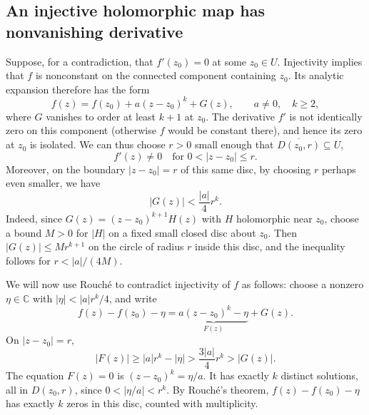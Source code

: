 \documentclass[11pt]{article}
\theoremstyle{plain}
\theoremstyle{definition}
\theoremstyle{boldremark}
\theoremstyle{remark}
\numberwithin{equation}{section}
\newcommand{\C}{\mathbb{C}}
\begin{document}
\subsection{An injective holomorphic map has nonvanishing derivative}

Suppose, for a contradiction, that $f'(z_0)=0$ at some $z_0\in U$.
Injectivity implies that $f$ is nonconstant on the connected component
containing $z_0$. Its analytic expansion therefore has the form
\[
 f(z)=f(z_0)+a(z-z_0)^k+G(z),\qquad a\ne0,\quad k\geq2,
\]
where $G$ vanishes to order at least $k+1$ at $z_0$.
The derivative $f'$ is not identically zero on this component (otherwise
$f$ would be constant there), and hence its zero at $z_0$ is isolated. We can thus
choose $r>0$ small enough that $\overline{D(z_0,r)}\subseteq U$,
\[
 f'(z)\ne0\quad\text{for }0<|z-z_0|\leq r.
\]
Moreover, on the boundary $|z-z_0|=r$ of this same disc, by choosing $r$
perhaps even smaller, we have
\[
 |G(z)| < \frac{|a|}{4}r^k.
\]
Indeed, since $G(z)=(z-z_0)^{k+1}H(z)$ with $H$
holomorphic near $z_0$, choose a bound $M>0$ for $|H|$ on a fixed small
closed disc about $z_0$. Then $|G(z)|\leq Mr^{k+1}$ on the circle of
radius $r$ inside this disc, and the inequality follows for $r<|a|/(4M)$.

We will now use Rouch\'e to contradict injectivity of $f$ as follows: choose a nonzero $\eta\in\C$ with $|\eta|<|a|r^k/4$, and write
\[
 f(z)-f(z_0)-\eta
 =\underbrace{a(z-z_0)^k-\eta}_{F(z)}+G(z).
\]
On $|z-z_0|=r$,
\[
 |F(z)|\geq|a|r^k-|\eta|>\frac{3|a|}{4}r^k>|G(z)|.
\]
The equation $F(z)=0$ is $(z-z_0)^k=\eta/a$. It has exactly $k$ distinct
solutions, all in $D(z_0,r)$, since $0<|\eta/a|<r^k$.
By Rouch\'e's theorem, $f(z)-f(z_0)-\eta$ has exactly $k$ zeros in this
disc, counted with multiplicity.
\end{document}

